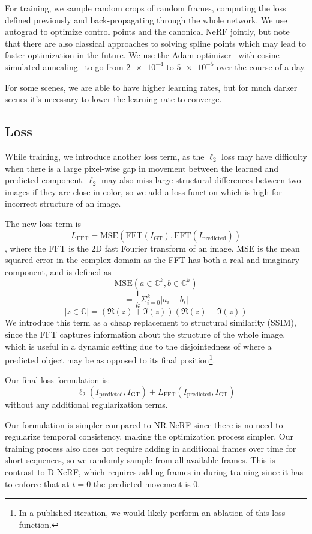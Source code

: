 For training, we sample random crops of random frames, computing the loss defined previously and back-propagating through the whole network. We use autograd to optimize control points and the canonical NeRF jointly, but note that there are also classical approaches to solving spline points which may lead to faster optimization in the future. We use the Adam optimizer~\cite{Kingma2015AdamAM} with cosine simulated annealing~\cite{loshchilov2017sgdr} to go from $\num{2e-4}$ to $\num{5e-5}$ over the course of a day.

For some scenes, we are able to have higher learning rates, but for much darker scenes it's necessary to lower the learning rate to converge.

\iffalse
\subsection*{Loss}

While training, we introduce another loss term, as the $\ell_2$ loss may have
difficulty when there is a large pixel-wise gap in movement between the learned and predicted
component. $\ell_2$ may also miss large structural differences between two images if they are close in color, so we add a loss function which is high for incorrect structure of an image.

The new loss term is \[
    L_\text{FFT} = \text{MSE}(\text{FFT}(I_\text{GT}), \text{FFT}(I_\text{predicted}))
\],
where the FFT is the 2D fast Fourier transform of an image.
MSE is the mean squared error in the complex domain as the FFT has both a real and imaginary component, and is defined as \[ \text{MSE}(a\in\mathbb{C}^k,b\in\mathbb{C}^k) \]
\[ = \frac{1}{k}\Sigma_{i=0}^k|a_i-b_i| \]
\[ |z\in\mathbb{C}| = (\Re(z)+\Im(z))(\Re(z)-\Im(z)) \]
We introduce this term as a cheap replacement to structural similarity (SSIM), since the
FFT captures information about the structure of the whole image, which is useful in a dynamic setting due to the disjointedness of where a predicted object may be as opposed to its final position\footnote{In a published iteration, we would likely perform an ablation of this loss function.}.

Our final loss formulation is:
\[ \ell_2(I_\text{predicted}, I_\text{GT}) + L_\text{FFT}(I_\text{predicted}, I_\text{GT}) \]
without any additional regularization terms.

Our formulation is simpler compared to NR-NeRF since there is no need to regularize
temporal consistency, making the optimization process simpler. Our training process also does not require adding in additional frames over time for short sequences, so we randomly sample from all available frames. This is contrast to D-NeRF, which requires adding frames in during training since it has to enforce that at $t=0$ the predicted movement is 0.

